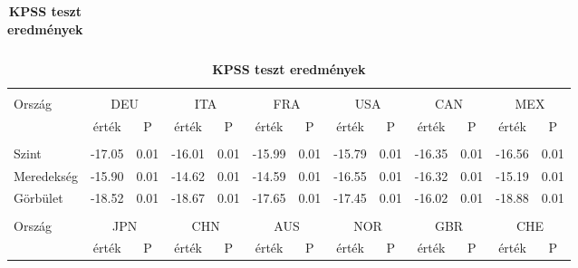 \documentclass[12pt,bibliography=totoc]{article}
\begin{document}
\begin{table}
\begin{subtable}[t]{1\textwidth}
\begin{tabular}{l cc cc cc cc cc cc}
\hline
\end{tabular}
\caption{\textbf{KPSS teszt eredmények}}

\end{subtable}
\hspace{\fill}
\bigskip

\begin{subtable}[t]{1\textwidth}
\centering
\begin{tabular}{l cc cc cc cc cc cc}%
\hline\hline \\ [-1.5ex]                         %

Ország	&	\multicolumn{2}{c}{DEU}			&	\multicolumn{2}{c}{ITA}			&	\multicolumn{2}{c}{FRA}			&	\multicolumn{2}{c}{USA}			&	\multicolumn{2}{c}{CAN}			&	\multicolumn{2}{c}{MEX}			\\[0.5ex] 

 & érték &P & érték &P& érték &P & érték &P& érték &P & érték &P\\

\hline       \\ [-1.5ex] 

Szint	&	-17.05	&	0.01	&	-16.01	&	0.01	&	-15.99	&	0.01	&	-15.79	&	0.01	&	-16.35	&	0.01	&	-16.56	&	0.01	\\
Meredekség	&	-15.90	&	0.01	&	-14.62	&	0.01	&	-14.59	&	0.01	&	-16.55	&	0.01	&	-16.32	&	0.01	&	-15.19	&	0.01	\\
\medskip
Görbület	&-18.52	&	0.01	&	-18.67	&	0.01	&	-17.65	&	0.01	&	-17.45	&	0.01	&	-16.02	&	0.01	&	-18.88	&	0.01	\\


\hline   \\ [-1.5ex]    

Ország	&	\multicolumn{2}{c}{JPN}			&	\multicolumn{2}{c}{CHN}			&	\multicolumn{2}{c}{AUS}			&	\multicolumn{2}{c}{NOR}			&	\multicolumn{2}{c}{GBR}			&	\multicolumn{2}{c}{CHE}			\\

 & érték &P & érték &P& érték &P & érték &P& érték &P & érték &P\\


\end{tabular}
\end{subtable}
\end{table}
\end{document}
